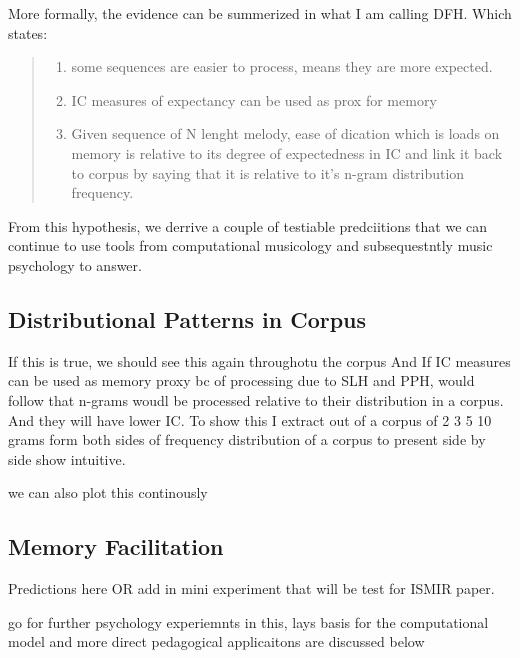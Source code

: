 \documentclass[]{book}
\providecommand{\tightlist}{%
  \setlength{\itemsep}{0pt}\setlength{\parskip}{0pt}}
\begin{document}
More formally, the evidence can be summerized in what I am calling DFH.
Which states:

\begin{quote}
\begin{enumerate}
\def\labelenumi{\arabic{enumi}.}
\tightlist
\item
  some sequences are easier to process, means they are more expected.
\item
  IC measures of expectancy can be used as prox for memory
\item
  Given sequence of N lenght melody, ease of dication which is loads on memory is relative to its degree of expectedness in IC and link it back to corpus by saying that it is relative to it's n-gram distribution frequency.
\end{enumerate}
\end{quote}

From this hypothesis, we derrive a couple of testiable predciitions that we can continue to
use tools from computational musicology and subsequestntly music psychology to answer.

\hypertarget{distributional-patterns-in-corpus}{%
\subsection{Distributional Patterns in Corpus}\label{distributional-patterns-in-corpus}}

If this is true, we should see this again throughotu the corpus
And If IC measures can be used as memory proxy bc of processing due to SLH and PPH, would follow that n-grams woudl be processed relative to their distribution in a corpus.
And they will have lower IC.
To show this I extract out of a corpus of 2 3 5 10 grams form both sides of frequency distribution of a corpus to present side by side show intuitive.

we can also plot this continously

\hypertarget{memory-facilitation}{%
\subsection{Memory Facilitation}\label{memory-facilitation}}

Predictions here OR add in mini experiment that will be test for ISMIR paper.

go for further psychology experiemnts in this,
lays basis for the computational model
and more direct pedagogical applicaitons are discussed below
\end{document}
